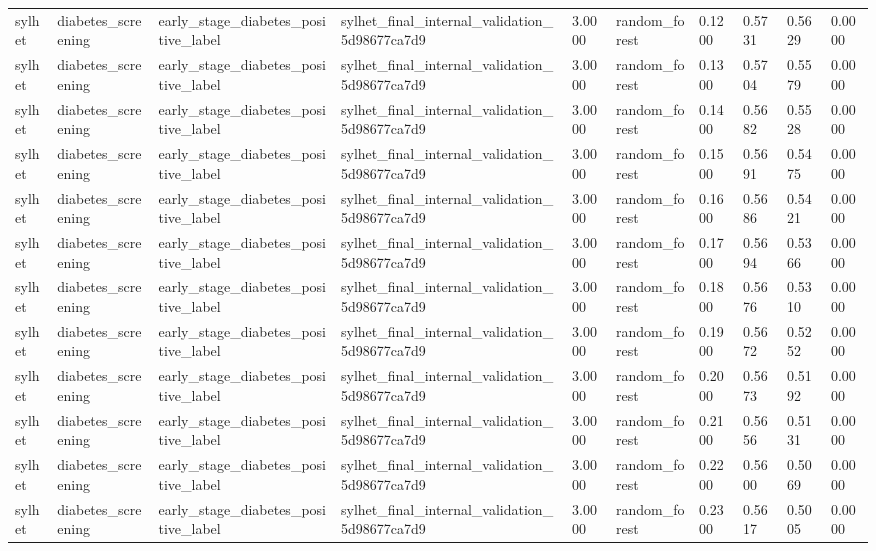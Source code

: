 \begin{tabular}{llllllllll}
sylhet & diabetes\_screening & early\_stage\_diabetes\_positive\_label & sylhet\_final\_internal\_validation\_5d98677ca7d9 & 3.0000 & random\_forest & 0.1200 & 0.5731 & 0.5629 & 0.0000 \\
sylhet & diabetes\_screening & early\_stage\_diabetes\_positive\_label & sylhet\_final\_internal\_validation\_5d98677ca7d9 & 3.0000 & random\_forest & 0.1300 & 0.5704 & 0.5579 & 0.0000 \\
sylhet & diabetes\_screening & early\_stage\_diabetes\_positive\_label & sylhet\_final\_internal\_validation\_5d98677ca7d9 & 3.0000 & random\_forest & 0.1400 & 0.5682 & 0.5528 & 0.0000 \\
sylhet & diabetes\_screening & early\_stage\_diabetes\_positive\_label & sylhet\_final\_internal\_validation\_5d98677ca7d9 & 3.0000 & random\_forest & 0.1500 & 0.5691 & 0.5475 & 0.0000 \\
sylhet & diabetes\_screening & early\_stage\_diabetes\_positive\_label & sylhet\_final\_internal\_validation\_5d98677ca7d9 & 3.0000 & random\_forest & 0.1600 & 0.5686 & 0.5421 & 0.0000 \\
sylhet & diabetes\_screening & early\_stage\_diabetes\_positive\_label & sylhet\_final\_internal\_validation\_5d98677ca7d9 & 3.0000 & random\_forest & 0.1700 & 0.5694 & 0.5366 & 0.0000 \\
sylhet & diabetes\_screening & early\_stage\_diabetes\_positive\_label & sylhet\_final\_internal\_validation\_5d98677ca7d9 & 3.0000 & random\_forest & 0.1800 & 0.5676 & 0.5310 & 0.0000 \\
sylhet & diabetes\_screening & early\_stage\_diabetes\_positive\_label & sylhet\_final\_internal\_validation\_5d98677ca7d9 & 3.0000 & random\_forest & 0.1900 & 0.5672 & 0.5252 & 0.0000 \\
sylhet & diabetes\_screening & early\_stage\_diabetes\_positive\_label & sylhet\_final\_internal\_validation\_5d98677ca7d9 & 3.0000 & random\_forest & 0.2000 & 0.5673 & 0.5192 & 0.0000 \\
sylhet & diabetes\_screening & early\_stage\_diabetes\_positive\_label & sylhet\_final\_internal\_validation\_5d98677ca7d9 & 3.0000 & random\_forest & 0.2100 & 0.5656 & 0.5131 & 0.0000 \\
sylhet & diabetes\_screening & early\_stage\_diabetes\_positive\_label & sylhet\_final\_internal\_validation\_5d98677ca7d9 & 3.0000 & random\_forest & 0.2200 & 0.5600 & 0.5069 & 0.0000 \\
sylhet & diabetes\_screening & early\_stage\_diabetes\_positive\_label & sylhet\_final\_internal\_validation\_5d98677ca7d9 & 3.0000 & random\_forest & 0.2300 & 0.5617 & 0.5005 & 0.0000 \\

\end{tabular}
